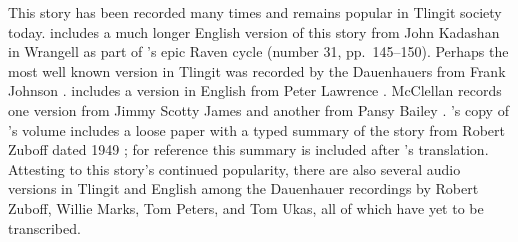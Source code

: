 This story has been recorded many times and remains popular in Tlingit society today.
\citeauthor{swanton:1909} includes a much longer English version of this story from  John Kadashan in Wrangell as part of ’s epic Raven cycle (number 31, pp.\ 145–150).
Perhaps the most well known version in Tlingit was recorded by the Dauenhauers from  Frank Johnson \parencite[136–151]{dauenhauer:1987}.
\citeauthor{de-laguna:1972} includes a version in English from  Peter Lawrence \parencite[890–892]{de-laguna:1972}.
McClellan records one version from  Jimmy Scotty James \parencite[439–440]{mcclellan-cruikshank:2007b} and another from  Pansy Bailey \parencite[684–687]{mcclellan-cruikshank:2007c}.
\citeauthor{paul:1930}’s copy of \citeauthor{swanton:1909}’s volume includes a loose paper with a typed summary of the story from  Robert Zuboff dated 1949 \parencite[289]{paul:1930}; for reference this summary is included after \citeauthor{swanton:1909}’s translation.
Attesting to this story’s continued popularity, there are also several audio versions in Tlingit and English among the Dauenhauer recordings by  Robert Zuboff,  Willie Marks,  Tom Peters, and  Tom Ukas, all of which have yet to be transcribed.

